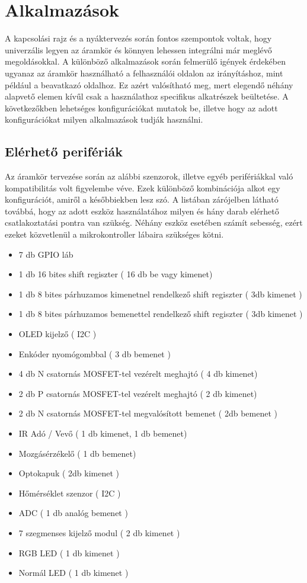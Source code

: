 \chapter{Alkalmazások}

A kapcsolási rajz és a nyáktervezés során fontos szempontok voltak, hogy univerzális legyen az áramkör és könnyen lehessen integrálni már meglévő megoldásokkal. A különböző alkalmazások során felmerülő igények érdekében ugyanaz az áramkör használható a felhasználói oldalon az irányításhoz, mint például a beavatkazó oldalhoz. Ez azért valósítható meg, mert elegendő néhány alapvető elemen kívűl csak a használathoz specifikus alkatrészek beültetése.
A következőkben lehetséges konfigurációkat mutatok be, illetve hogy az adott konfigurációkat milyen alkalmazások tudják használni.

\section{Elérhető perifériák}
Az áramkör tervezése során az alábbi szenzorok, illetve egyéb perifériákkal való kompatibilitás volt figyelembe véve. Ezek különböző kombinációja alkot egy konfigurációt, amiről a későbbiekben lesz szó. A listában zárójelben látható továbbá, hogy az adott eszköz használatához milyen és hány darab elérhető csatlakoztatási pontra van szükség. Néhány eszköz esetében számít sebesség, ezért ezeket közvetlenül a mikrokontroller lábaira szükséges kötni.
\begin{itemize}
    \item 7 db GPIO láb
    \item 1 db 16 bites shift regiszter ( 16 db be vagy kimenet)
    \item 1 db 8 bites párhuzamos kimenetnel rendelkező shift regiszter ( 3db kimenet )
    \item 1 db 8 bites párhuzamos bemenettel rendelkező shift regiszter ( 3db kimenet )
    \item OLED kijelző ( I2C )
    \item Enkóder nyomógombbal ( 3 db bemenet )
    \item 4 db N csatornás MOSFET-tel vezérelt meghajtó ( 4 db kimenet)
    \item 2 db P csatornás MOSFET-tel vezérelt meghajtó ( 2 db kimenet)
    \item 2 db N csatornás MOSFET-tel megvalósított bemenet ( 2db bemenet )
    \item IR Adó / Vevő ( 1 db kimenet, 1 db bemenet)
    \item Mozgásérzékelő ( 1 db bemenet)
    \item Optokapuk ( 2db kimenet )
    \item Hőmérséklet szenzor ( I2C )
    \item ADC ( 1 db analóg bemenet )
    \item 7 szegmenses kijelző modul ( 2 db kimenet )
    \item RGB LED ( 1 db kimenet )
    \item Normál LED ( 1 db kimenet )
\end{itemize}

